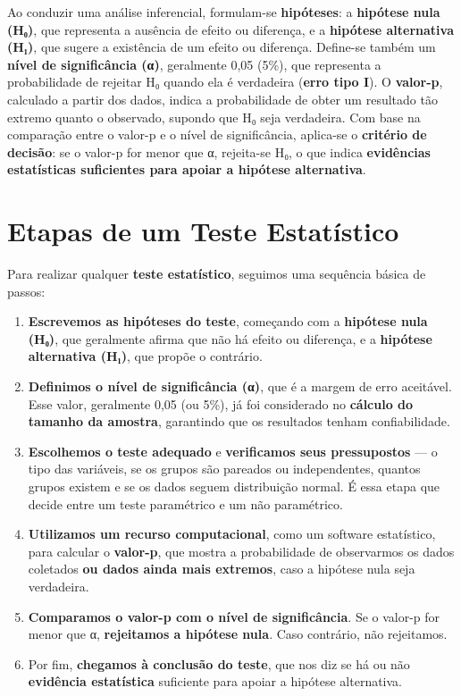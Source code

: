 \documentclass[
]{book}
\begin{document}
Ao conduzir uma análise inferencial, formulam-se \textbf{hipóteses}: a \textbf{hipótese nula (H₀)}, que representa a ausência de efeito ou diferença, e a \textbf{hipótese alternativa (H₁)}, que sugere a existência de um efeito ou diferença. Define-se também um \textbf{nível de significância (α)}, geralmente 0,05 (5\%), que representa a probabilidade de rejeitar H₀ quando ela é verdadeira (\textbf{erro tipo I}). O \textbf{valor-p}, calculado a partir dos dados, indica a probabilidade de obter um resultado tão extremo quanto o observado, supondo que H₀ seja verdadeira. Com base na comparação entre o valor-p e o nível de significância, aplica-se o \textbf{critério de decisão}: se o valor-p for menor que α, rejeita-se H₀, o que indica \textbf{evidências estatísticas suficientes para apoiar a hipótese alternativa}.

\section{Etapas de um Teste Estatístico}\label{etapas-de-um-teste-estatuxedstico}

Para realizar qualquer \textbf{teste estatístico}, seguimos uma sequência básica de passos:

\begin{enumerate}
\def\labelenumi{\arabic{enumi}.}
\item
  \textbf{Escrevemos as hipóteses do teste}, começando com a \textbf{hipótese nula (H₀)}, que geralmente afirma que não há efeito ou diferença, e a \textbf{hipótese alternativa (H₁)}, que propõe o contrário.
\item
  \textbf{Definimos o nível de significância (α)}, que é a margem de erro aceitável. Esse valor, geralmente 0,05 (ou 5\%), já foi considerado no \textbf{cálculo do tamanho da amostra}, garantindo que os resultados tenham confiabilidade.
\item
  \textbf{Escolhemos o teste adequado} e \textbf{verificamos seus pressupostos} --- o tipo das variáveis, se os grupos são pareados ou independentes, quantos grupos existem e se os dados seguem distribuição normal. É essa etapa que decide entre um teste paramétrico e um não paramétrico.
\item
  \textbf{Utilizamos um recurso computacional}, como um software estatístico, para calcular o \textbf{valor-p}, que mostra a probabilidade de observarmos os dados coletados \textbf{ou dados ainda mais extremos}, caso a hipótese nula seja verdadeira.
\item
  \textbf{Comparamos o valor-p com o nível de significância}. Se o valor-p for menor que α, \textbf{rejeitamos a hipótese nula}. Caso contrário, não rejeitamos.
\item
  Por fim, \textbf{chegamos à conclusão do teste}, que nos diz se há ou não \textbf{evidência estatística} suficiente para apoiar a hipótese alternativa.
\end{enumerate}
\end{document}
